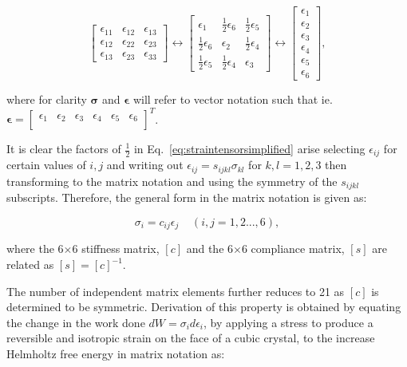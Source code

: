 \begin{equation}
\label{eq:straintensorsimplified}
\begin{bmatrix}
\epsilon_{11} & \epsilon_{12} & \epsilon_{13} \\ 
\epsilon_{12} & \epsilon_{22}  & \epsilon_{23}\\ 
\epsilon_{13} & \epsilon_{23} & \epsilon_{33}
\end{bmatrix} \leftrightarrow 
\begin{bmatrix}
\epsilon_{1} & \frac{1}{2}\epsilon_{6} & \frac{1}{2}\epsilon_{5} \\ 
\frac{1}{2}\epsilon_{6} & \epsilon_{2}  & \frac{1}{2}\epsilon_{4}\\ 
\frac{1}{2}\epsilon_{5} & \frac{1}{2}\epsilon_{4} & \epsilon_{3}
\end{bmatrix} \leftrightarrow 
\begin{bmatrix}
\epsilon_{1}\\ 
\epsilon_{2}\\ 
\epsilon_{3}\\ 
\epsilon_{4}\\ 
\epsilon_{5}\\ 
\epsilon_{6}
\end{bmatrix},
\end{equation}

\noindent where for clarity $\bm{\sigma}$ and $\bm{\epsilon}$ will refer to vector notation such that ie. $\bm{\epsilon}=\begin{bmatrix} \epsilon_{1} & \epsilon_{2} & \epsilon_{3} & \epsilon_{4} & \epsilon_{5} & \epsilon_{6} \\ \end{bmatrix}^{T}$.


It is clear the factors of $\frac{1}{2}$ in Eq.~\ref{eq:straintensorsimplified} arise selecting $\epsilon_{ij}$ for certain values of $i,j$ and writing out $\epsilon_{ij}=s_{ijkl}\sigma_{kl}$ for $k,l=1,2,3$ then transforming to the matrix notation and using the symmetry of the $s_{ijkl}$ subscripts. Therefore, the general form in the matrix notation is given as: 

\begin{equation}
\label{eq:generalmatrixnotation}
\sigma_{i} = c_{ij}\epsilon_{j} \;\;\;\; (i,j = 1,2...,6),
\end{equation} 

\noindent where the 6$\times$6 stiffness matrix, $[c]$ and the 6$\times$6 compliance matrix, $[s]$ are related as $[s]=[c]^{-1}$. 

The number of independent matrix elements further reduces to 21 as $[c]$ is determined to be symmetric. Derivation of this property is obtained by equating the change in the work done $dW=\sigma_{i}d\epsilon_{i}$, by applying a stress to produce a reversible and isotropic strain on the face of a cubic crystal, to the increase Helmholtz free energy in matrix notation as:

